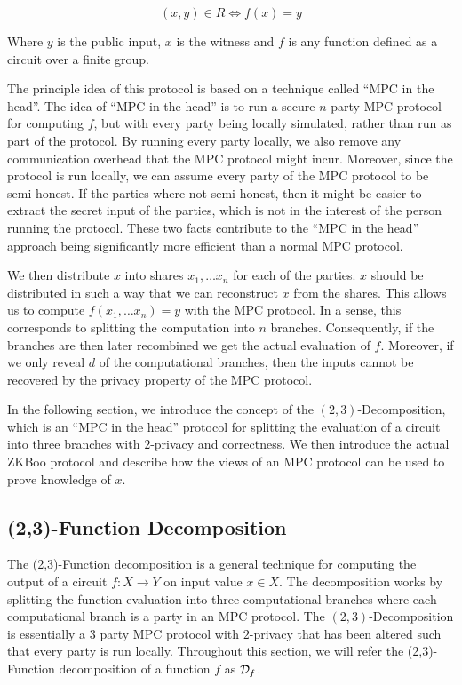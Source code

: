 \[
  (x, y) \in R \iff f(x) = y
\]

Where $y$ is the public input, $x$ is the witness and $f$ is any function
defined as a circuit over a finite group.

The principle idea of this protocol is based on a technique called ``MPC in the
head''. The idea of ``MPC in the head'' is to run a secure $n$ party MPC protocol for computing
$f$, but with every party being locally simulated, rather than run as part of
the protocol.
By running every party locally, we also remove any communication overhead that the MPC
protocol might incur. Moreover, since the protocol is run locally, we can assume
every party of the MPC protocol to be semi-honest. If the parties where not
semi-honest, then it might be easier to extract the secret input of the parties,
which is not in the interest of the person running the protocol.
These two facts contribute to the ``MPC in the head'' approach being significantly
more efficient than a normal MPC protocol.

We then distribute $x$ into shares $x_1, \dots x_{n}$ for each of the parties. $x$ should be
distributed in such a way that we can reconstruct $x$ from the shares. This
allows us to compute $f(x_{1}, \dots x_{n}) = y$ with the MPC protocol.
In a sense, this corresponds to splitting the computation
into $n$ branches. Consequently, if the branches are then later recombined
we get the actual evaluation of $f$.
Moreover, if we only reveal $d$ of the computational branches, then the inputs
cannot be recovered by the privacy property of the MPC protocol.

In the following section, we introduce the concept of the $(2,3)$-Decomposition,
which is an ``MPC in the head'' protocol for splitting the evaluation of a
circuit into three branches with $2$-privacy and correctness. We then introduce
the actual ZKBoo protocol and describe how the views of an MPC protocol can be
used to prove knowledge of $x$.

\subsection{(2,3)-Function Decomposition}
\label{subsec:decomposition}
The (2,3)-Function decomposition is a general technique for computing the output of
a circuit $f : X \rightarrow Y$ on input value $x \in X$.
The decomposition works by splitting the function evaluation into three
computational branches where each computational branch is a party in an MPC
protocol. The $(2,3)$-Decomposition is essentially a $3$ party MPC protocol with
$2$-privacy that has been altered such that every party is run locally.
Throughout this section, we will refer the (2,3)-Function decomposition
of a function $f$ as $\mathcal{D}_{f}$.


